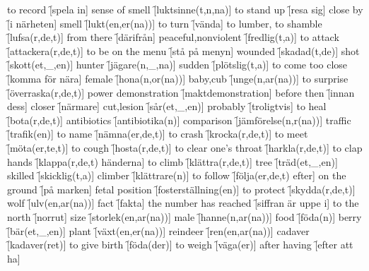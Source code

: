 \begin{questions}
\begin{multicols}{2}
        \question to record \f[spela in]
        \question sense of smell \f[luktsinne(t,n,na)]
        \question to stand up \f[resa sig]
        \question close by \f[i närheten]
        \question smell \f[lukt(en,er(na))]
        \question to turn \f[vända]
        \question to lumber, to shamble \f[lufsa(r,de,t)]
        \question from there \f[därifrån]
        \question peaceful,nonviolent \f[fredlig(t,a)]
        \question to attack \f[attackera(r,de,t)]
        \question to be on the menu \f[stå på menyn]
        \question wounded \f[skadad(t,de)]
        \question shot \f[skott(et,\_,en)]
        \question hunter \f[jägare(n,\_,na)]
        \question sudden \f[plötslig(t,a)]
        \question to come too close \f[komma för nära]
        \question female \f[hona(n,or(na))]
        \question baby,cub \f[unge(n,ar(na))]
        \question to surprise \f[överraska(r,de,t)]
        \question power demonstration \f[maktdemonstration]
        \question before then \f[innan dess]
        \question closer \f[närmare]
        \question cut,lesion \f[sår(et,\_,en)]
        \question probably \f[troligtvis]
        \question to heal \f[bota(r,de,t)]
        \question antibiotics \f[antibiotika(n)]
        \question comparison \f[jämförelse(n,r(na))]
        \question traffic \f[trafik(en)]
        \question to name \f[nämna(er,de,t)]
        \question to crash \f[krocka(r,de,t)]
        \question to meet \f[möta(er,te,t)]
        \question to cough \f[hosta(r,de,t)]
        \question to clear one's throat \f[harkla(r,de,t)]
        \question to clap hands \f[klappa(r,de,t) händerna]
        \question to climb \f[klättra(r,de,t)]
        \question tree \f[träd(et,\_,en)]
        \question skilled \f[skicklig(t,a)]
        \question climber \f[klättrare(n)]
        \question to follow \f[följa(er,de,t) efter]
        \question on the ground \f[på marken]
        \question fetal position \f[fosterställning(en)]
        \question to protect \f[skydda(r,de,t)]
        \question wolf \f[ulv(en,ar(na))]
        \question fact \f[fakta]
        \question the number has reached \f[siffran  är uppe i]
        \question to the north \f[norrut]
        \question size \f[storlek(en,ar(na))]
        \question male \f[hanne(n,ar(na))]
        \question food \f[föda(n)]
        \question berry \f[bär(et,\_,en)]
        \question plant \f[växt(en,er(na))]
        \question reindeer \f[ren(en,ar(na))]
        \question cadaver \f[kadaver(ret)]
        \question to give birth \f[föda(der)]
        \question to weigh \f[väga(er)]
        \question after having \f[efter att ha]

\end{multicols}
\end{questions}
